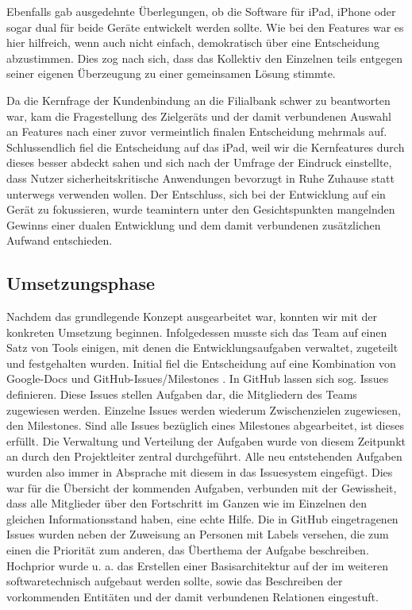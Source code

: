 	Ebenfalls gab ausgedehnte Überlegungen, ob die Software für iPad, iPhone oder sogar dual für beide Geräte entwickelt werden sollte. Wie bei den Features war es hier hilfreich, wenn auch nicht einfach, demokratisch über eine Entscheidung abzustimmen. Dies zog nach sich, dass das Kollektiv den Einzelnen teils entgegen seiner eigenen Überzeugung zu einer gemeinsamen Lösung stimmte. 
	
	Da die Kernfrage der Kundenbindung an die Filialbank schwer zu beantworten war, kam die Fragestellung des Zielgeräts und der damit verbundenen Auswahl an Features nach einer zuvor vermeintlich finalen Entscheidung mehrmals auf. Schlussendlich fiel die Entscheidung auf das iPad, weil wir die Kernfeatures durch dieses besser abdeckt sahen und sich nach der Umfrage der Eindruck einstellte, dass Nutzer sicherheitskritische Anwendungen bevorzugt in Ruhe Zuhause statt unterwegs verwenden wollen. Der Entschluss, sich bei der Entwicklung auf ein Gerät zu fokussieren, wurde teamintern unter den Gesichtspunkten mangelnden Gewinns einer dualen Entwicklung und dem damit verbundenen zusätzlichen Aufwand entschieden.

\subsection{Umsetzungsphase}
	Nachdem das grundlegende Konzept ausgearbeitet war, konnten wir mit der konkreten Umsetzung beginnen. Infolgedessen musste sich das Team auf einen Satz von Tools einigen, mit denen die Entwicklungsaufgaben verwaltet, zugeteilt und festgehalten wurden. Initial fiel die Entscheidung auf eine Kombination von Google-Docs und GitHub-Issues/Milestones \citep{GitHubIssues14} \citep{GitHubFeatures14}. In GitHub lassen sich sog. Issues definieren. Diese Issues stellen Aufgaben dar, die Mitgliedern des Teams zugewiesen werden. Einzelne Issues werden wiederum Zwischenzielen zugewiesen, den Milestones. Sind alle Issues bezüglich eines Milestones abgearbeitet, ist dieses erfüllt. Die Verwaltung und Verteilung der Aufgaben wurde von diesem Zeitpunkt an durch den Projektleiter zentral durchgeführt. Alle neu entstehenden Aufgaben wurden also immer in Absprache mit diesem in das Issuesystem eingefügt. Dies war für die Übersicht der kommenden Aufgaben, verbunden mit der Gewissheit, dass alle Mitglieder über den Fortschritt im Ganzen wie im Einzelnen den gleichen Informationsstand haben, eine echte Hilfe. Die in GitHub eingetragenen Issues wurden neben der Zuweisung an Personen mit Labels versehen, die zum einen die Priorität zum anderen, das Überthema der Aufgabe beschreiben. Hochprior wurde u. a. das Erstellen einer Basisarchitektur auf der im weiteren softwaretechnisch aufgebaut werden sollte, sowie das Beschreiben der vorkommenden Entitäten und der damit verbundenen Relationen eingestuft. 

